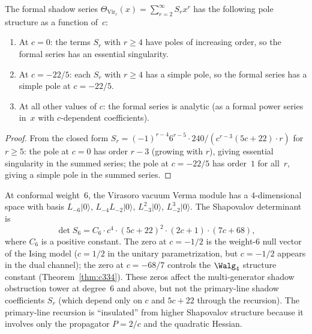 \begin{proposition}
\label{prop:pole-structure-shadow-series}
The formal shadow series
$\Theta_{\mathrm{Vir}_c}(x) = \sum_{r=2}^\infty S_r x^r$
has the following pole structure as a function of~$c$:
\begin{enumerate}[label=\textup{(\roman*)}]
\item At $c = 0$: the terms $S_r$ with $r \geq 4$ have
 poles of increasing order, so the formal series has
 an essential singularity.
\item At $c = -22/5$: each $S_r$ with $r \geq 4$ has a
 simple pole, so the formal series has a simple pole
 at $c = -22/5$.
\item At all other values of $c$: the formal series
 is analytic (as a formal power series in~$x$ with
 $c$-dependent coefficients).
\end{enumerate}
\end{proposition}

\begin{proof}
From the closed form
$S_r = (-1)^{r-4} 6^{r-5} \cdot 240 / (c^{r-3}(5c+22) \cdot r)$
for $r \geq 5$: the pole at $c = 0$ has order $r - 3$
(growing with $r$), giving essential singularity in the
summed series; the pole at $c = -22/5$ has order~$1$
for all~$r$, giving a simple pole in the summed series.
\end{proof}

\begin{remark}
\label{rem:weight-6-shapovalov}
At conformal weight~$6$, the Virasoro vacuum Verma module
has a $4$-dimensional space with basis
$L_{-6}|0\rangle$, $L_{-4}L_{-2}|0\rangle$,
$L_{-3}^2|0\rangle$, $L_{-2}^3|0\rangle$.
The Shapovalov determinant is
\[
\det S_6 = C_6 \cdot c^4 \cdot (5c+22)^2 \cdot (2c+1)
\cdot (7c+68),
\]
where $C_6$ is a positive constant. The zero at
$c = -1/2$ is the weight-$6$ null vector of the Ising
model ($c = 1/2$ in the unitary parametrization, but
$c = -1/2$ appears in the dual channel); the zero at
$c = -68/7$ controls the $\Walg_4$ structure constant
(Theorem~\ref{thm:c334}). These zeros affect the
multi-generator shadow obstruction tower at degree~$6$ and above,
but not the primary-line shadow coefficients $S_r$ (which
depend only on $c$ and $5c+22$ through the recursion).
The primary-line recursion is ``insulated'' from higher
Shapovalov structure because it involves only the
propagator $P = 2/c$ and the quadratic Hessian.
\end{remark}

